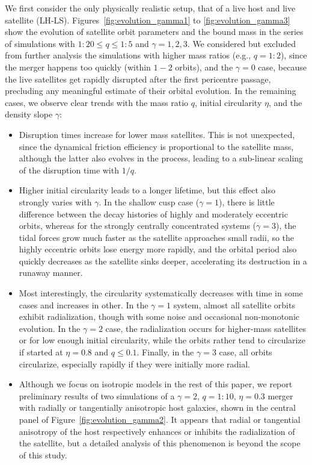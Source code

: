 \documentclass[twocolumn]{aastex63}
\newcommand{\LH}{\textsf{L\!H}\xspace}
\newcommand{\LS}{\textsf{L\!S}\xspace}
\begin{document}
We first consider the only physically realistic setup, that of a live host and live satellite (\LH-\LS). 
Figures~\ref{fig:evolution_gamma1} to \ref{fig:evolution_gamma3} show the evolution of satellite orbit parameters and the bound mass in the series of simulations with $1:20\le q \le 1:5$ and $\gamma=1,2,3$. We considered but excluded from further analysis the simulations with higher mass ratios (e.g., $q=1:2$), since the merger happens too quickly (within $1-2$ orbits), and the $\gamma=0$ case, because the live satellites get rapidly disrupted after the first pericentre passage, precluding any meaningful estimate of their orbital evolution. In the remaining cases, we observe clear trends with the mass ratio $q$, initial circularity $\eta$, and the density slope $\gamma$:
\begin{itemize}
\item Disruption times increase for lower mass satellites. This is not unexpected, since the dynamical friction efficiency is proportional to the satellite mass, although the latter also evolves in the process, leading to a sub-linear scaling of the disruption time with $1/q$.
%
\item Higher initial circularity leads to a longer lifetime, but this effect also strongly varies with $\gamma$. In the shallow cusp case ($\gamma=1$), there is little difference between the decay histories of highly and moderately eccentric orbits, whereas for the strongly centrally concentrated systems ($\gamma=3$), the tidal forces grow much faster as the satellite approaches small radii, so the highly eccentric orbits lose energy more rapidly, and the orbital period also quickly decreases as the satellite sinks deeper, accelerating its destruction in a runaway manner.
%
\item Most interestingly, the circularity systematically decreases with time in some cases and increases in other. In the $\gamma=1$ system, almost all satellite orbits exhibit radialization, though with some noise and occasional non-monotonic evolution. In the $\gamma=2$ case, the radialization occurs for higher-mass satellites or for low enough initial circularity, while the orbits rather tend to circularize if started at $\eta=0.8$ and $q\le 0.1$. Finally, in the $\gamma=3$ case, all orbits circularize, especially rapidly if they were initially more radial.
%
\item Although we focus on isotropic models in the rest of this paper, we report preliminary results of two simulations of a $\gamma=2,\, q=1\!:\!10,\, \eta=0.3$ merger with radially or tangentially anisotropic host galaxies, shown in the central panel of Figure~\ref{fig:evolution_gamma2}. It appears that radial or tangential anisotropy of the host respectively enhances or inhibits the radialization of the satellite, but a detailed analysis of this phenomenon is beyond the scope of this study.
\end{itemize}
\end{document}
